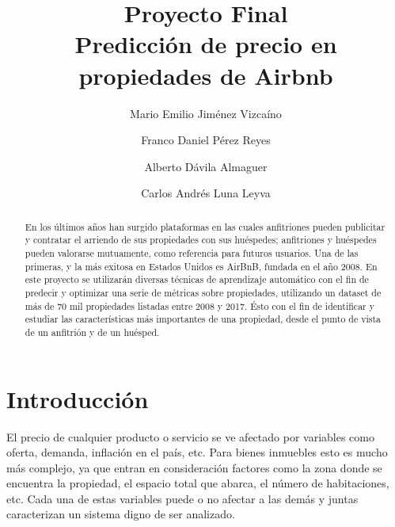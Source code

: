 \documentclass[sigconf,authorversion,nonacm]{acmart}
\begin{document}
\title{Proyecto Final \\ Predicción de precio en propiedades de Airbnb}

\author{Mario Emilio Jiménez Vizcaíno}

\author{Franco Daniel Pérez Reyes}

\author{Alberto Dávila Almaguer}

\author{Carlos Andrés Luna Leyva}


\begin{abstract}
En los últimos años han surgido plataformas en las cuales anfitriones pueden publicitar y contratar el arriendo de sus propiedades con sus huéspedes; anfitriones y huéspedes pueden valorarse mutuamente, como referencia para futuros usuarios. Una de las primeras, y la más exitosa en Estados Unidos es AirBnB, fundada en el año 2008. En este proyecto se utilizarán diversas técnicas de aprendizaje automático con el fin de predecir y optimizar una serie de métricas sobre propiedades, utilizando un dataset de más de 70 mil propiedades listadas entre 2008 y 2017. Ésto con el fin de identificar y estudiar las características más importantes de una propiedad, desde el punto de vista de un anfitrión y de un huésped.
\end{abstract}

\maketitle

\section{Introducción}
El precio de cualquier producto o servicio se ve afectado por variables como oferta, demanda, inflación en el país, etc. Para bienes inmuebles esto es mucho más complejo, ya que entran en consideración factores como la zona donde se encuentra la propiedad, el espacio total que abarca, el número de habitaciones, etc. Cada una de estas variables puede o no afectar a las demás y juntas caracterizan un sistema digno de ser analizado. 
\end{document}
